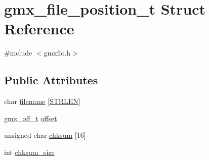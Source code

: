 \hypertarget{structgmx__file__position__t}{\section{gmx\-\_\-file\-\_\-position\-\_\-t \-Struct \-Reference}
\label{structgmx__file__position__t}
}


{\ttfamily \#include $<$gmxfio.\-h$>$}

\subsection*{\-Public \-Attributes}
\begin{DoxyCompactItemize}
\item 
char \hyperlink{structgmx__file__position__t_ab21db5925d4c230c6af4b61c3a52b4b6}{filename} \mbox{[}\hyperlink{share_2template_2gromacs_2types_2simple_8h_a278cf415676752815cfb411cb0b32802}{\-S\-T\-R\-L\-E\-N}\mbox{]}
\item 
\hyperlink{include_2futil_8h_a62ca72cb29d851d8f5bcbe6809d3786d}{gmx\-\_\-off\-\_\-t} \hyperlink{structgmx__file__position__t_a505ec19a84ba674c782e47dae8cf6ba3}{offset}
\item 
unsigned char \hyperlink{structgmx__file__position__t_a8d9f583a2435adc8db9e3c31114732b2}{chksum} \mbox{[}16\mbox{]}
\item 
int \hyperlink{structgmx__file__position__t_a9f8367fc49db11350e1d20a054d829c6}{chksum\-\_\-size}
\end{DoxyCompactItemize}


